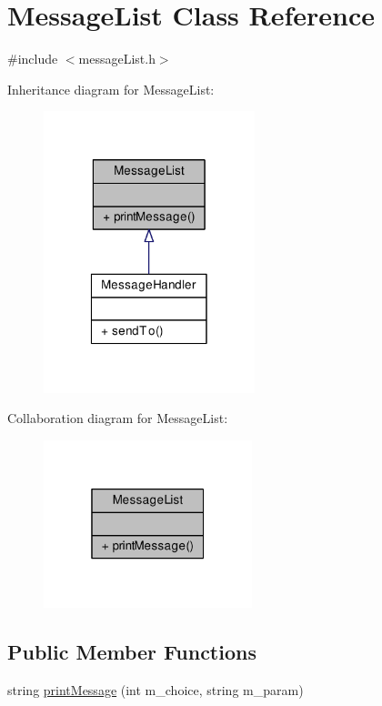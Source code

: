 \hypertarget{class_message_list}{}\section{Message\+List Class Reference}
\label{class_message_list}


{\ttfamily \#include $<$message\+List.\+h$>$}



Inheritance diagram for Message\+List\+:
\nopagebreak
\begin{figure}[H]
\begin{center}
\leavevmode
\includegraphics[width=174pt]{class_message_list__inherit__graph}
\end{center}
\end{figure}


Collaboration diagram for Message\+List\+:
\nopagebreak
\begin{figure}[H]
\begin{center}
\leavevmode
\includegraphics[width=172pt]{class_message_list__coll__graph}
\end{center}
\end{figure}
\subsection*{Public Member Functions}
\begin{DoxyCompactItemize}
\item 
string \hyperlink{class_message_list_afb4e1522ab3d886c6cffb698ea139d2a}{print\+Message} (int m\+\_\+choice, string m\+\_\+param)
\end{DoxyCompactItemize}


